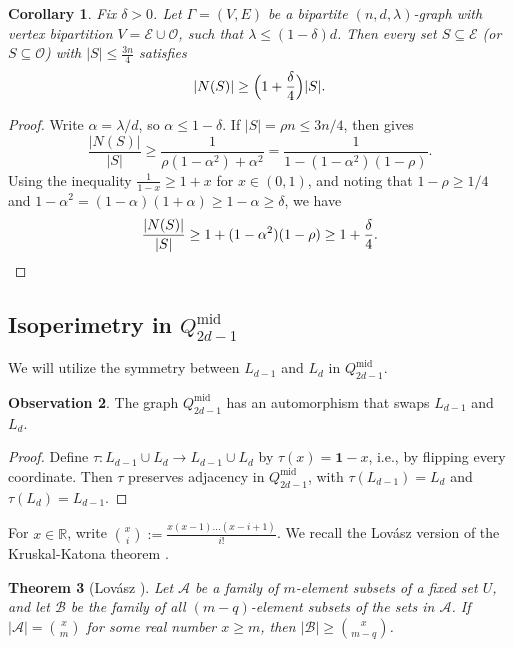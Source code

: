 \documentclass{amsart}
\newtheorem{thm}{Theorem}[section]
\newtheorem{cor}[thm]{Corollary}
\theoremstyle{definition}
\newtheorem{obs}[thm]{Observation}
\newcommand{\RR}{\mathbb{R}}
\newcommand{\cO}{\mathcal{O} }
\newcommand{\cA}{\mathcal{A} }
\newcommand{\cB}{\mathcal{B} }
\newcommand{\cE}{\mathcal{E} }
\newcommand{\0}[0]{\emptyset}
\begin{document}
\begin{cor}\label{prop:expand-3/4}
Fix $\delta>0$. Let $\Gamma=(V,E)$ be a bipartite $(n,d,\lambda)$-graph with vertex bipartition $V=\cE\cup \cO$, such that $\lambda\le (1-\delta)d$. Then every set $S\subseteq \cE$ (or $S\subseteq \cO$) with $|S|\le \frac{3n}{4}$
satisfies
\[
|N(S)|\ge \Bigl(1+\frac{\delta}{4}\Bigr)|S|.
\]
\end{cor}

\begin{proof}
Write $\alpha=\lambda/d$, so $\alpha\le 1-\delta$. If $|S|=\rho n\le 3n/4$, then  gives
\[
\frac{|N(S)|}{|S|}
\ge
\frac{1}{\rho(1-\alpha^2)+\alpha^2}
=
\frac{1}{1-(1-\alpha^2)(1-\rho)}.
\]
Using the inequality $\frac{1}{1-x} \ge 1+x$ for $x \in (0,1)$, and noting that $1-\rho\ge 1/4$ and $1-\alpha^2=(1-\alpha)(1+\alpha)\ge 1-\alpha\ge \delta$, we have
\[
\frac{|N(S)|}{|S|}
\ge
1+(1-\alpha^2)(1-\rho)
\ge
1+\frac{\delta}{4}. \qedhere
\]
\end{proof}

\subsection{Isoperimetry in $Q_{2d-1}^{\mathrm{mid}}$}

We will utilize the symmetry between $L_{d-1}$ and $L_d$ in $Q_{2d-1}^{\mathrm{mid}}$.

\begin{obs}\label{obs:symmetry}
    The graph $Q_{2d-1}^{\mathrm{mid}}$ has an automorphism that swaps $L_{d-1}$ and $L_d$.
\end{obs}
\begin{proof}
Define $\tau:L_{d-1}\cup L_d\to L_{d-1}\cup L_d$ by $\tau(x)=\mathbf 1-x$, i.e., by flipping every coordinate. Then $\tau$ preserves adjacency in $Q_{2d-1}^{\mathrm{mid}}$, with $\tau(L_{d-1})=L_d$ and $\tau(L_d)=L_{d-1}$.
\end{proof}

For $x \in \RR$, write $\binom{x}{i}:=\frac{x(x-1)\ldots(x-i+1)}{i!}$. We recall the Lov\'asz version of the Kruskal-Katona theorem \cite{kruskal1963number, katona1968theorem}. 

\begin{thm}[Lov\'asz \cite{lovasz2007combinatorial}] \label{thm:lovasz}
Let $\cA$ be a family of $m$-element subsets of a fixed set $U$, and let $\cB$ be the family of all $(m-q)$-element subsets of the sets in $\cA$. If $|\cA|=\binom{x}{m}$ for some real number $x \geq m$, then $|\cB|\geq\binom{x}{m-q}$.    
\end{thm}
\end{document}
